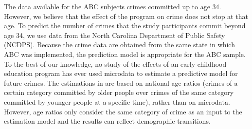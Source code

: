 \noindent The data available for the ABC subjects crimes committed up to age 34. However, we believe that the effect of the program on crime does not stop at that age. To predict the number of crimes that the study participants commit beyond age 34, we use data from the North Carolina Department of Public Safety (NCDPS). Because the crime data are obtained from the same state in which ABC was implemented, the prediction model is appropriate for the ABC sample. To the best of our knowledge, no study of the effects of an early childhood education program has ever used microdata to estimate a predictive model for future crimes. The estimations in \cite{Heckman_Moon_etal_2010_RateofReturn} are based on national age ratios (crimes of a certain category committed by older people over crimes of the same category committed by younger people at a specific time), rather than on microdata. However, age ratios only consider the same category of crime as an input to the estimation model and the results can reflect demographic transitions. \\

